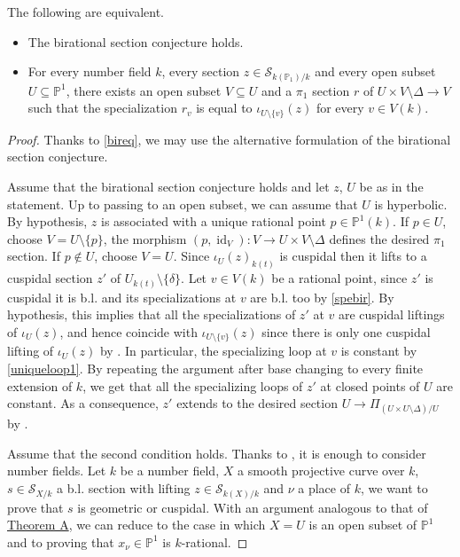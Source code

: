 \documentclass[11pt]{amsart}
\theoremstyle{plain}
\theoremstyle{definition}
\newcommand{\on}{\operatorname}
\newcommand{\1}{\mathbb{1}}
\newcommand{\id}{\on{id}}
\newcommand{\mc}{\mathcal}
\newcommand{\s}{\subseteq}
\renewcommand{\P}{\mathbb{P}}
\begin{document}
\begin{TC}
	The following are equivalent.
	\begin{itemize}
		\item The birational section conjecture holds.
		\item For every number field $k$, every section $z\in\mc{S}_{k(\P_{1})/k}$ and every open subset $U\s\P^{1}$, there exists an open subset $V\s U$ and a $\pi_{1}$ section $r$ of $U\times V\setminus\Delta \to V$ such that the specialization $r_{v}$ is equal to $\iota_{U\setminus\{v\}}(z)$ for every $v\in V(k)$.
	\end{itemize}
	\begin{proof}
            Thanks to \autoref{bireq}, we may use the alternative formulation of the birational section conjecture.
    
		Assume that the birational section conjecture holds and let $z$, $U$ be as in the statement. Up to passing to an open subset, we can assume that $U$ is hyperbolic. By hypothesis, $z$ is associated with a unique rational point $p\in\P^{1}(k)$. If $p\in U$, choose $V=U\setminus\{p\}$, the morphism $(p,\id_{V}):V\to U\times V\setminus\Delta$ defines the desired $\pi_{1}$ section. If $p\not \in U$, choose $V=U$. Since $\iota_{U}(z)_{k(t)}$ is cuspidal then it lifts to a cuspidal section $z'$ of $U_{k(t)}\setminus\{\delta\}$. Let $v\in V(k)$ be a rational point, since $z'$ is cuspidal it is b.l. and its specializations at $v$ are b.l. too by \autoref{spebir}. By hypothesis, this implies that all the specializations of $z'$ at $v$ are cuspidal liftings of $\iota_{U}(z)$, and hence coincide with $\iota_{U\setminus\{v\}}(z)$ since there is only one cuspidal lifting of $\iota_{U}(z)$ by \cite[Theorem 17 (2)]{sti12}. In particular, the specializing loop at $v$ is constant by \autoref{uniqueloop1}. By repeating the argument after base changing to every finite extension of $k$, we get that all the specializing loops of $z'$ at closed points of $U$ are constant. As a consequence, $z'$ extends to the desired section $U\to\Pi_{(U\times U\setminus\Delta)/U}$ by \cite[Corollary A.3]{fed}.
  
            Assume that the second condition holds. Thanks to \cite[Theorem C]{saty21}, it is enough to consider number fields. Let $k$ be a number field, $X$ a smooth projective curve over $k$, $s\in\mc{S}_{X/k}$ a b.l. section with lifting $z\in\mc{S}_{k(X)/k}$ and $\nu$ a place of $k$, we want to prove that $s$ is geometric or cuspidal. With an argument analogous to that of \hyperlink{TA}{Theorem A}, we can reduce to the case in which $X=U$ is an open subset of $\P^{1}$ and to proving that $x_{\nu}\in\P^{1}$ is $k$-rational.
		

\end{proof}
\end{TC}
\end{document}
